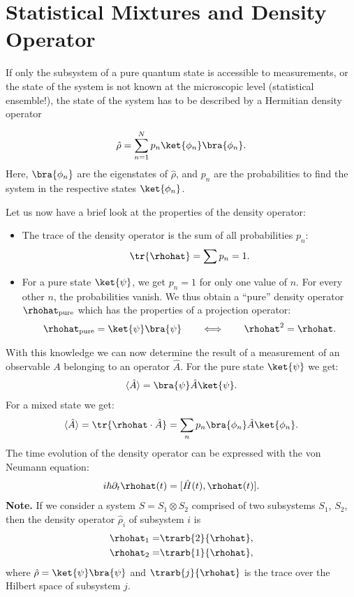 \section{Statistical Mixtures and Density Operator}

If only the subsystem of a pure quantum state is accessible to measurements, or the state of the system is not known at the microscopic level (statistical ensemble!), the state of the system has to be described by a Hermitian density operator

\begin{align}
 \hat{\rho} = \sum_{n=1}^N p_n \ket{\phi_n}\bra{\phi_n}.
\end{align}
Here, $\bra{\phi_n}$ are the eigenstates of $\hat{\rho}$, and $p_n$ are the probabilities to find the system in the respective states $\ket{\phi_n}$.

Let us now have a brief look at the properties of the density operator:
\begin{itemize}
    \item The trace of the density operator is the sum of all probabilities $p_n$:
	\begin{align}
	    \tr{\rhohat} = \sum p_n = 1.
	\end{align}
	\item For a pure state $\ket{\psi}$, we get $p_n=1$ for only one value of $n$. For every other $n$, the probabilities vanish. We thus obtain a ``pure'' density operator $\rhohat_{\text{pure}}$ which has the properties of a projection operator:
	\begin{align}
					\rhohat_{\text{pure}} = \ket{\psi}\bra{\psi} \qquad \Longleftrightarrow \qquad \rhohat^2 = \rhohat.
				\end{align}
\end{itemize}
With this knowledge we can now determine the result of a measurement of an observable $A$ belonging to an operator $\hat{A}$. For the pure state $\ket{\psi}$ we get:
%
\begin{align}
				\langle \hat{A}\rangle = \bra{\psi} \hat{A} \ket{\psi}.
\end{align}
For a mixed state we get:
\begin{align}
	\langle \hat{A}\rangle = \tr{\rhohat \cdot \hat{A}} = \sum_n {p_n} \bra{\phi_n} \hat{A} \ket{\phi_n}.
\end{align}
The time evolution of the density operator can be expressed with the von Neumann equation:
\begin{align}
	i\hbar \partial_{t}\rhohat(t) = [\hat{H}(t),\rhohat(t)].
\end{align}
\textbf{Note.} 
If we consider a system $S = S_1 \otimes S_2$ comprised of two subsystems $S_1$, $S_2$, then the density operator $\hat{\rho}_i$ of  subsystem $i$ is
					\begin{align}
						\rhohat_1=&\trarb{2}{\rhohat},\\
						\rhohat_2=&\trarb{1}{\rhohat},
					\end{align}
					where $\hat{\rho}=\ket{\psi}\bra{\psi}$ and $\trarb{j}{\rhohat}$ is the trace over the Hilbert space of subsystem $j$.


